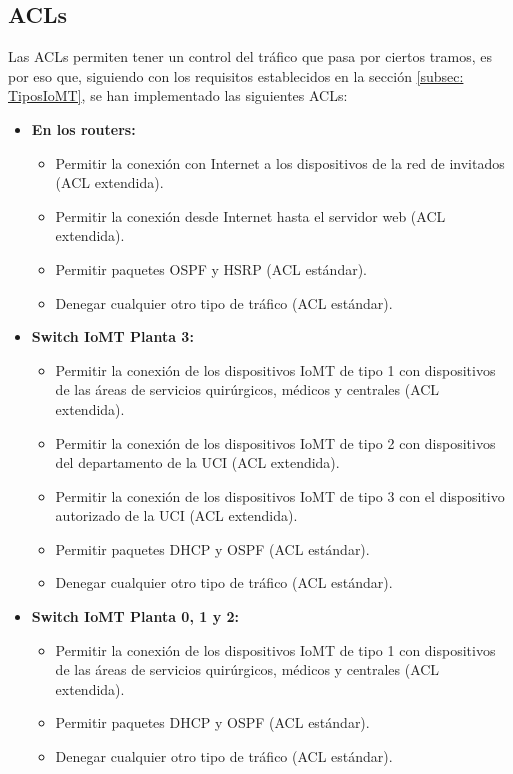 \subsection{ACLs}\label{subsec:acls}
Las ACLs permiten tener un control del tráfico que pasa por ciertos tramos, es por eso que, siguiendo con los requisitos establecidos en la sección \ref{subsec: TiposIoMT}, se han implementado las siguientes ACLs:
\begin{itemize}
    \item \textbf{En los routers:} 
    \begin{itemize}
        \item Permitir la conexión con Internet a los dispositivos de la red de invitados (ACL extendida).
        \item Permitir la conexión desde Internet hasta el servidor web (ACL extendida).
        \item Permitir paquetes OSPF y HSRP (ACL estándar).
        \item Denegar cualquier otro tipo de tráfico (ACL estándar).
    \end{itemize}
    \item \textbf{Switch IoMT Planta 3:}
    \begin{itemize}
        \item Permitir la conexión de los dispositivos IoMT de tipo 1 con dispositivos de las áreas de servicios quirúrgicos, médicos y centrales (ACL extendida).
        \item Permitir la conexión de los dispositivos IoMT de tipo 2 con dispositivos del departamento de la UCI (ACL extendida).
        \item Permitir la conexión de los dispositivos IoMT de tipo 3 con el dispositivo autorizado de la UCI (ACL extendida).
        \item Permitir paquetes DHCP y OSPF (ACL estándar).
        \item Denegar cualquier otro tipo de tráfico (ACL estándar).
    \end{itemize}
    \item \textbf{Switch IoMT Planta 0, 1 y 2:}
    \begin{itemize}
        \item Permitir la conexión de los dispositivos IoMT de tipo 1 con dispositivos de las áreas de servicios quirúrgicos, médicos y centrales (ACL extendida).
        \item Permitir paquetes DHCP y OSPF (ACL estándar).
        \item Denegar cualquier otro tipo de tráfico (ACL estándar).

\end{itemize}
\end{itemize}
